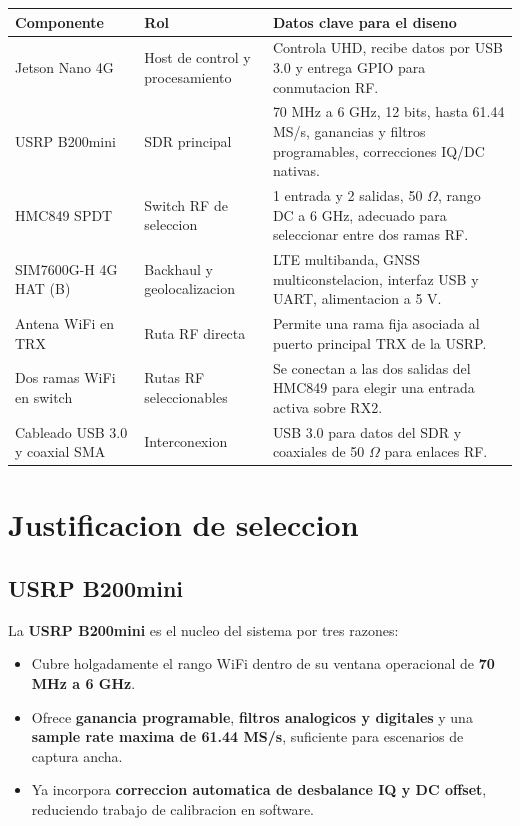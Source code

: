 \documentclass[11pt]{article}
\begin{document}
\begin{table}[h]
    \centering
    \small
    \begin{tabular}{p{}p{}p{}}
        \toprule
        \textbf{Componente} & \textbf{Rol} & \textbf{Datos clave para el diseno} \\
        \midrule
        Jetson Nano 4G & Host de control y procesamiento & Controla UHD, recibe datos por USB 3.0 y entrega GPIO para conmutacion RF. \\
        USRP B200mini & SDR principal & 70 MHz a 6 GHz, 12 bits, hasta 61.44 MS/s, ganancias y filtros programables, correcciones IQ/DC nativas. \\
        HMC849 SPDT & Switch RF de seleccion & 1 entrada y 2 salidas, 50 $\Omega$, rango DC a 6 GHz, adecuado para seleccionar entre dos ramas RF. \\
        SIM7600G-H 4G HAT (B) & Backhaul y geolocalizacion & LTE multibanda, GNSS multiconstelacion, interfaz USB y UART, alimentacion a 5 V. \\
        Antena WiFi en TRX & Ruta RF directa & Permite una rama fija asociada al puerto principal TRX de la USRP. \\
        Dos ramas WiFi en switch & Rutas RF seleccionables & Se conectan a las dos salidas del HMC849 para elegir una entrada activa sobre RX2. \\
        Cableado USB 3.0 y coaxial SMA & Interconexion & USB 3.0 para datos del SDR y coaxiales de 50 $\Omega$ para enlaces RF. \\
        \bottomrule
    \end{tabular}
\end{table}

\section{Justificacion de seleccion}

\subsection{USRP B200mini}

La \textbf{USRP B200mini} es el nucleo del sistema por tres razones:

\begin{itemize}[leftmargin=*]
    \item Cubre holgadamente el rango WiFi dentro de su ventana operacional de \textbf{70 MHz a 6 GHz}.
    \item Ofrece \textbf{ganancia programable}, \textbf{filtros analogicos y digitales} y una \textbf{sample rate maxima de 61.44 MS/s}, suficiente para escenarios de captura ancha.
    \item Ya incorpora \textbf{correccion automatica de desbalance IQ y DC offset}, reduciendo trabajo de calibracion en software.
\end{itemize}
\end{document}
